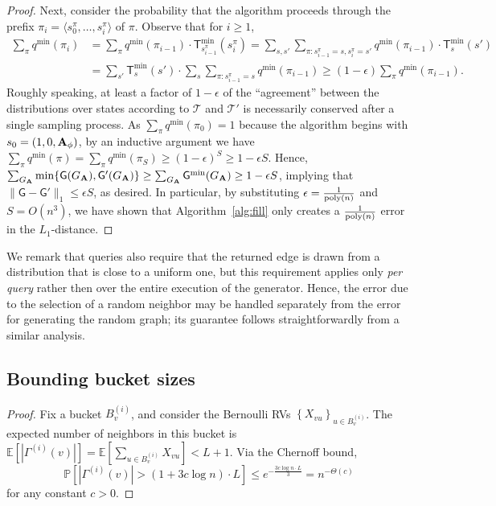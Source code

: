 \begin{proof}
Next, consider the probability that the algorithm proceeds through the prefix $\pi_i = \langle s^\pi_0, \ldots, s^\pi_{i}\rangle$ of $\pi$. Observe that for $i \geq 1$,
\begin{align*}\sum_{\pi} q^{\min}(\pi_i) &=\sum_{\pi} q^{\min}(\pi_{i-1})\cdot \mathsf{T}^{\min}_{s^\pi_{i-1}}(s^\pi_{i}) 
= \sum_{s,s'} \sum_{\pi:s^\pi_{i-1} = s,s^\pi_{i} = s'} q^{\min}(\pi_{i-1})\cdot \mathsf{T}^{\min}_{s}(s') \\
&= \sum_{s'} \mathsf{T}^{\min}_s(s')\cdot\sum_{s} \sum_{\pi:s^\pi_{i-1} = s} q^{\min}(\pi_{i-1})
\geq (1-\epsilon) \sum_{\pi} q^{\min}(\pi_{i-1}).\end{align*}
Roughly speaking, at least a factor of $1-\epsilon$ of the ``agreement'' between the distributions over states according to $\mathcal{T}$ and $\mathcal{T}'$ is necessarily conserved after a single sampling process. As $\sum_{\pi} q^{\min}(\pi_0)=1$ because the algorithm begins with $s_0 = (1, 0, \mathbf{A}_\phi)$, by an inductive argument we have $\sum_{\pi} q^{\min}(\pi)=\sum_{\pi} q^{\min}(\pi_S) \geq (1-\epsilon)^S \geq 1-\epsilon S$. Hence, $\sum_{G_{\mathbf{A}}} \min\{\mathsf{G}(G_{\mathbf{A}}),\mathsf{G}'(G_{\mathbf{A}})\} \geq \sum_{G_{\mathbf{A}}} \mathsf{G}^{\min}(G_{\mathbf{A}}) \geq 1-\epsilon S$, implying that $\|\mathsf{G}-\mathsf{G}'\|_1 \leq \epsilon S$, as desired. In particular,  by substituting $\epsilon = \frac{1}{\mathrm{poly}(n)}$ and $S = O(n^3)$, we have shown that Algorithm~\ref{alg:fill} only creates a $\frac{1}{\mathrm{poly}(n)}$ error in the $L_1$-distance. 
\end{proof}

We remark that  queries also require that the returned edge is drawn from a distribution that is close to a uniform one, but this requirement applies only \emph{per query} rather then over the entire execution of the generator. Hence, the error due to the selection of a random neighbor may be handled separately from the error for generating the random graph; its guarantee follows straightforwardly from a similar analysis.





\subsection{Bounding bucket sizes}\label{sec:bounding_bucket_sizes}
\MaxBucketSize*
\begin{proof}
Fix a bucket $B_v^{(i)}$, and consider the Bernoulli RVs $\left\{ X_{vu}\right\}_{u\in B_v^{(i)}}$.
The expected number of neighbors in this bucket is
$ \textstyle\mathbb{E} \left[ |\Gamma^{(i)}(v)| \right] =\mathbb{E} \left[ \sum_{u\in B_v^{(i)}} X_{vu} \right] < L+1$.
Via the Chernoff bound,
\[
\mathbb{P} \left[ |\Gamma^{(i)}(v)|> (1+3c\log n)\cdot L \right]
\le e^{-\frac{3c\log n\cdot L}{3}} = n^{-\Theta(c)}
\]
for any constant $c > 0$.
\end{proof}

